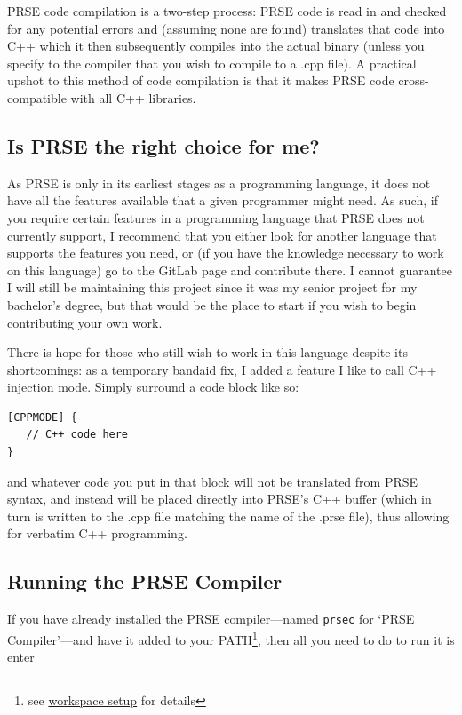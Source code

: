\documentclass[letterpaper, 12pt]{article}
\begin{document}
PRSE code compilation is a two-step process: PRSE code is read in and checked for any potential
errors and (assuming none are found) translates that code into C++ which it then subsequently
compiles into the actual binary (unless you specify to the compiler that you wish to compile to a
.cpp file). A practical upshot to this method of code compilation is that it makes PRSE code
cross-compatible with all C++ libraries.

\subsection{Is PRSE the right choice for me?}
As PRSE is only in its earliest stages as a programming language, it does not have all the features
available that a given programmer might need. As such, if you require certain features in a
programming language that PRSE does not currently support, I recommend that you either look for
another language that supports the features you need, or (if you have the knowledge necessary to
work on this language) go to the GitLab page %
and contribute there. I cannot guarantee I will still be maintaining this project since it was my
senior project for my bachelor's degree, but that would be the place to start if you wish to begin
contributing your own work.\linebreak

There is hope for those who still wish to work in this language despite its shortcomings: as a
temporary bandaid fix, I added a feature I like to call C++ injection mode. Simply surround a code
block like so:

\begin{lstlisting}
[CPPMODE] {
   // C++ code here
}
\end{lstlisting}

and whatever code you put in that block will not be translated from PRSE syntax, and instead will be
placed directly into PRSE's C++ buffer (which in turn is written to the .cpp file matching the name
of the .prse file), thus allowing for verbatim C++ programming.

\subsection{Running the PRSE Compiler}

If you have already installed the PRSE compiler---named \texttt{prsec} for `PRSE Compiler'---and
have it added to your PATH\footnote{see \hyperref[sec:prse-workspace-setup]{workspace setup} for
details}, then all you need to do to run it is enter\linebreak
\end{document}
